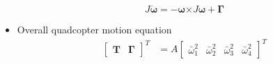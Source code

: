 \documentclass[10pt]{beamer}
\begin{document}
\begin{frame}
\begin{itemize}
\begin{equation}
			      J\boldsymbol{\Dot{\omega}}=-\boldsymbol{\omega} \boldsymbol{\times}J \boldsymbol{\omega}+\mathbf{\Gamma}
		      \end{equation}
			  \pause
			  \vspace*{-0.4 cm}
		\item Overall quadcopter motion equation
		      \begin{align}
			      \begin{bmatrix}
				      \mathbf{T} &
				      \mathbf{\Gamma}
			      \end{bmatrix}^T & =A\begin{bmatrix}
				      \bar{\omega}_{1}^{2} &
				      \bar{\omega}_{2}^{2} &
				      \bar{\omega}_{3}^{2} &
				      \bar{\omega}_{4}^{2}
			      \end{bmatrix}^T
		      \end{align}

	\end{itemize}

\end{frame}
\end{document}
